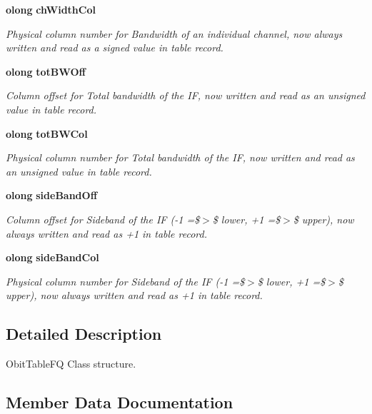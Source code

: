 \begin{CompactItemize}
{\bf olong} {\bf ch\-Width\-Col}
\begin{CompactList}\small\item\em Physical column number for Bandwidth of an individual channel, now always written and read as a signed value in table record. \item\end{CompactList}\item 
{\bf olong} {\bf tot\-BWOff}
\begin{CompactList}\small\item\em Column offset for Total bandwidth of the IF, now written and read as an unsigned value in table record. \item\end{CompactList}\item 
{\bf olong} {\bf tot\-BWCol}
\begin{CompactList}\small\item\em Physical column number for Total bandwidth of the IF, now written and read as an unsigned value in table record. \item\end{CompactList}\item 
{\bf olong} {\bf side\-Band\-Off}
\begin{CompactList}\small\item\em Column offset for Sideband of the IF (-1 =\$$>$\$ lower, +1 =\$$>$\$ upper), now always written and read as +1 in table record. \item\end{CompactList}\item 
{\bf olong} {\bf side\-Band\-Col}
\begin{CompactList}\small\item\em Physical column number for Sideband of the IF (-1 =\$$>$\$ lower, +1 =\$$>$\$ upper), now always written and read as +1 in table record. \item\end{CompactList}\end{CompactItemize}


\subsection{Detailed Description}
Obit\-Table\-FQ Class structure. 



\subsection{Member Data Documentation}
